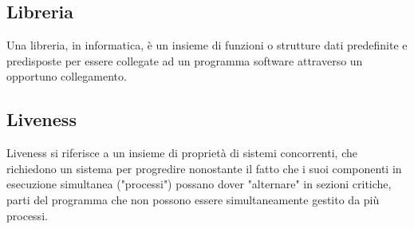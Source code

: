 
\subsection*{Libreria}
Una libreria, in informatica, è un insieme di funzioni o strutture dati predefinite e predisposte per essere collegate ad un programma software attraverso un opportuno collegamento.

\subsection*{Liveness}
Liveness si riferisce a un insieme di proprietà di sistemi concorrenti, che richiedono un sistema per progredire nonostante il fatto che i suoi componenti in esecuzione simultanea ("processi") possano dover "alternare" in sezioni critiche, parti del programma che non possono essere simultaneamente gestito da più processi.

